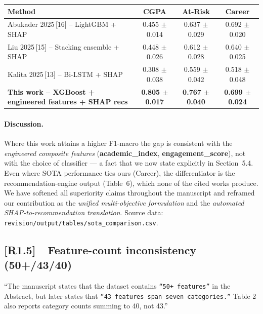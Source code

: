 \documentclass[11pt,a4paper]{article}
\newcommand{\cid}[1]{\textcolor{revred}{\textbf{[#1]}}}
\newcommand{\filebox}[1]{\texttt{\small #1}}
\newcommand{\sectref}[1]{Section~#1}
\newcommand{\stress}[1]{\textbf{#1}}
\begin{document}
\begin{center}\small
\begin{tabular}{l ccc}
\toprule
\textbf{Method} & \textbf{CGPA} & \textbf{At-Risk} & \textbf{Career} \\
\midrule
Abukader 2025\,[16] -- LightGBM + SHAP        & 0.455 $\pm$ 0.014 & 0.637 $\pm$ 0.029 & 0.692 $\pm$ 0.020 \\
Liu 2025\,[15] -- Stacking ensemble + SHAP    & 0.448 $\pm$ 0.026 & 0.612 $\pm$ 0.028 & 0.640 $\pm$ 0.025 \\
Kalita 2025\,[13] -- Bi-LSTM + SHAP           & 0.308 $\pm$ 0.038 & 0.559 $\pm$ 0.042 & 0.518 $\pm$ 0.048 \\
\stress{This work -- XGBoost + engineered features + SHAP recs} & \stress{0.805 $\pm$ 0.017} & \stress{0.767 $\pm$ 0.040} & \stress{0.699 $\pm$ 0.024} \\
\bottomrule
\end{tabular}
\end{center}

\paragraph{Discussion.} Where this work attains a higher F1-macro the gap is consistent with the \emph{engineered composite features} (\textbf{academic\_index}, \textbf{engagement\_score}), not with the choice of classifier --- a fact that we now state explicitly in \sectref{5.4}. Even where SOTA performance ties ours (Career), the differentiator is the recommendation-engine output (Table~6), which none of the cited works produce. We have softened all superiority claims throughout the manuscript and reframed our contribution as the \emph{unified multi-objective formulation} and the \emph{automated SHAP-to-recommendation translation}. Source data: \filebox{revision/output/tables/sota\_comparison.csv}.

\subsection*{\cid{R1.5}~~Feature-count inconsistency (50+/43/40)}

\begin{reviewerquote}
``The manuscript states that the dataset contains \texttt{``50+ features''} in the Abstract, but later states that \texttt{``43 features span seven categories.''} Table 2 also reports category counts summing to 40, not 43.''
\end{reviewerquote}
\end{document}
